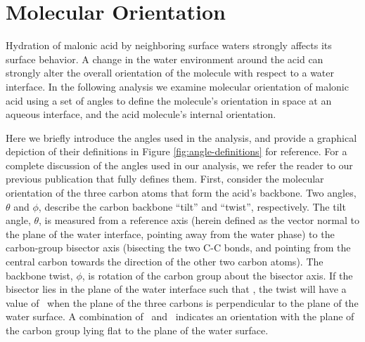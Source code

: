 \section {Molecular Orientation}

Hydration of malonic acid by neighboring surface waters strongly affects its surface behavior. A change in the water environment around the acid can strongly alter the overall orientation of the molecule with respect to a water interface. In the following analysis we examine molecular orientation of malonic acid using a set of angles to define the molecule's orientation in space at an aqueous interface, and the acid molecule's internal orientation. 

Here we briefly introduce the angles used in the analysis, and provide a graphical depiction of their definitions in Figure \ref{fig:angle-definitions} for reference. For a complete discussion of the angles used in our analysis, we refer the reader to our previous publication that fully defines them.\cite{Blower2012} First, consider the molecular orientation of the three carbon atoms that form the acid's backbone. Two angles, $\theta$ and $\phi$, describe the carbon backbone ``tilt'' and ``twist'', respectively. The tilt angle, $\theta$, is measured from a reference axis (herein defined as the vector normal to the plane of the water interface, pointing away from the water phase) to the carbon-group bisector axis (bisecting the two C-C bonds, and pointing from the central carbon towards the direction of the other two carbon atoms). The backbone twist, $\phi$, is rotation of the carbon group about the bisector axis. If the bisector lies in the plane of the water interface such that \degr, the twist will have a value of \degr~when the plane of the three carbons is perpendicular to the plane of the water surface. A combination of \degr~and \degr~indicates an orientation with the plane of the carbon group lying flat to the plane of the water surface.

